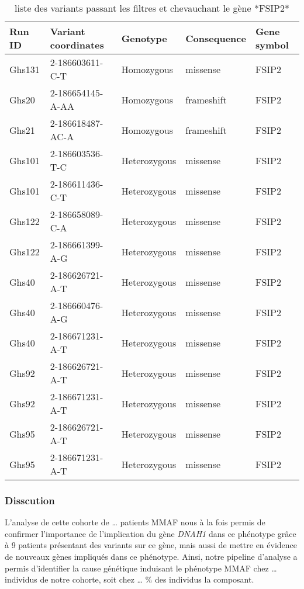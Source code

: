 \documentclass[12pt,twoside]{reedthesis}
\theoremstyle{definition}
\theoremstyle{definition}
\theoremstyle{remark}
\begin{document}
  \begin{longtable}[t]{lllll}
  \caption{\label{tab:tabfsip2}liste des variants passant les filtres et chevauchant le gène *FSIP2*}\\
  \toprule
  Run ID & Variant coordinates & Genotype & Consequence & Gene symbol\\
  \midrule
  Ghs131 & 2-186603611-C-T & Homozygous & missense & FSIP2\\
  Ghs20 & 2-186654145-A-AA & Homozygous & frameshift & FSIP2\\
  Ghs21 & 2-186618487-AC-A & Homozygous & frameshift & FSIP2\\
  Ghs101 & 2-186603536-T-C & Heterozygous & missense & FSIP2\\
  Ghs101 & 2-186611436-C-T & Heterozygous & missense & FSIP2\\
  \addlinespace
  Ghs122 & 2-186658089-C-A & Heterozygous & missense & FSIP2\\
  Ghs122 & 2-186661399-A-G & Heterozygous & missense & FSIP2\\
  Ghs40 & 2-186626721-A-T & Heterozygous & missense & FSIP2\\
  Ghs40 & 2-186660476-A-G & Heterozygous & missense & FSIP2\\
  Ghs40 & 2-186671231-A-T & Heterozygous & missense & FSIP2\\
  \addlinespace
  Ghs92 & 2-186626721-A-T & Heterozygous & missense & FSIP2\\
  Ghs92 & 2-186671231-A-T & Heterozygous & missense & FSIP2\\
  Ghs95 & 2-186626721-A-T & Heterozygous & missense & FSIP2\\
  Ghs95 & 2-186671231-A-T & Heterozygous & missense & FSIP2\\
  \bottomrule
  \end{longtable}
  
  \newpage
  
  \newpage
  
  \subsubsection{Disscution}\label{disscution}
  
  L'analyse de cette cohorte de \ldots{} patients MMAF nous à la fois
  permis de confirmer l'importance de l'implication du gène \emph{DNAH1}
  dans ce phénotype grâce à 9 patients présentant des variants sur ce
  gène, mais aussi de mettre en évidence de nouveaux gènes impliqués dans
  ce phénotype. Ainsi, notre pipeline d'analyse a permis d'identifier la
  cause génétique induisant le phénotype MMAF chez \ldots{} individus de
  notre cohorte, soit chez \ldots{} \% des individus la composant.
  
\end{document}
